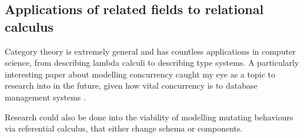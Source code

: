 \subsection{Applications of related fields to relational calculus}
Category theory is extremely general and has countless applications in computer science, from describing lambda calculi to describing type systems.\cite{BasicCategoryTheoryforCS} A particularly interesting paper about modelling concurrency \cite{CategoriesForModellingConcurrency} caught my eye as a topic to research into in the future, given how vital concurrency is to database management systems \cite{DatabaseSystems}.

Research could also be done into the viability of modelling mutating behaviours via referential calculus, that either change schema or components.
